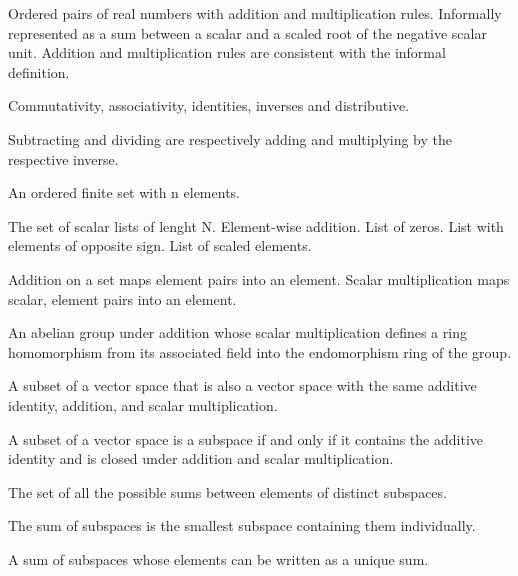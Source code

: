 \pagebreak


\begin{multicols}{3}

  Ordered pairs of real numbers with addition and multiplication rules.
  Informally represented as a sum between a scalar and a scaled root of the negative scalar unit.
  Addition and multiplication rules are consistent with the informal definition.

  Commutativity, associativity, identities, inverses and distributive.

  Subtracting and dividing are respectively adding and multiplying by the respective inverse.

  An ordered finite set with n elements.

  The set of scalar lists of lenght N.
   Element-wise addition.
   List of zeros.
   List with elements of opposite sign.
   List of scaled elements.

  Addition on a set maps element pairs into an element.
  Scalar multiplication maps scalar, element pairs into an element.

  An abelian group under addition whose scalar multiplication defines a ring homomorphism
  from its associated field into the endomorphism ring of the group.

  A subset of a vector space that is also a vector space with the same additive identity, addition, and scalar multiplication.

  A subset of a vector space is a subspace if and only if it contains the additive identity and is closed under addition and scalar multiplication.

  The set of all the possible sums between elements of distinct subspaces.
  
  The sum of subspaces is the smallest subspace containing them individually.
  
  A sum of subspaces whose elements can be written as a unique sum.
  

\end{multicols}
